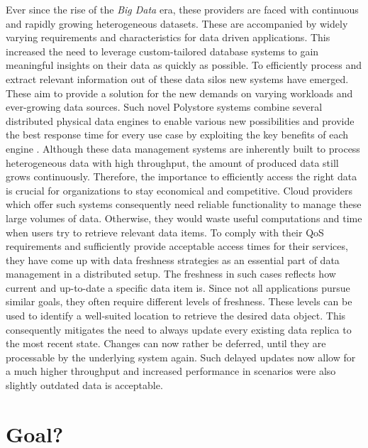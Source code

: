 Ever since the rise of the \emph{Big Data} era, these providers are faced with continuous
and rapidly growing heterogeneous datasets. These are accompanied by widely varying requirements 
and characteristics for data driven applications. This increased the need to leverage custom-tailored 
database systems to gain meaningful insights on their data as quickly as possible.
To efficiently process and extract relevant information out of these data silos new systems
have emerged. These aim to provide a solution for the new demands on varying workloads 
and ever-growing data sources.
Such novel Polystore systems combine several distributed physical data engines to enable various
new possibilities and provide the best response time for every use case by exploiting
the key benefits of each engine \cite{stonebraker:2005} \cite{polypheny2020}. Although these data management systems are inherently
built to process heterogeneous data with high throughput, the amount of produced data
still grows continuously.
Therefore, the importance to efficiently access the right data is crucial
for organizations to stay economical and competitive. Cloud providers which offer such systems consequently 
need reliable functionality to manage these large volumes of data. Otherwise, they would waste useful 
computations and time when users try to retrieve relevant data items\cite{levandowski2013}.
To comply with their QoS requirements and sufficiently provide acceptable access times for their services, 
they have come up with data freshness strategies as an essential part of data management in a
distributed setup. 
The freshness in such cases reflects how current and up-to-date a specific data item is.
Since not all applications pursue similar goals, they often require different levels of freshness.
These levels can be used to identify a well-suited location to retrieve the desired data object. 
This consequently mitigates the need to always update every existing data replica to the most recent state.
Changes can now rather be deferred, until they are processable by the underlying system again.
Such delayed updates now allow for a much higher throughput and increased performance in scenarios were also slightly 
outdated data is acceptable.




\section{Goal?}



